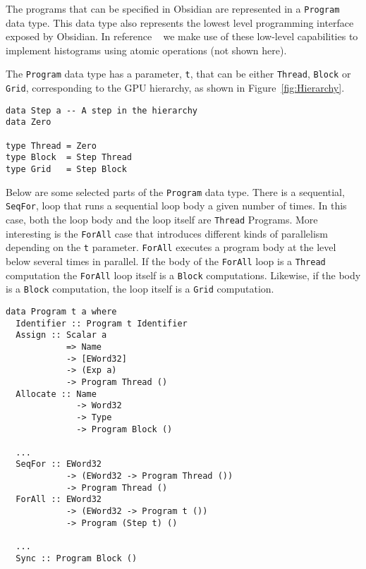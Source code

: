 The programs that can be specified in Obsidian
are represented in a {\tt Program} data type.
This data type also represents the lowest level programming interface 
exposed by Obsidian. In reference ~\cite{JOSEFJOELCSORT} we make use of these low-level 
capabilities to implement histograms using atomic operations (not shown here). 

The {\tt Program} data type has a parameter, {\tt t}, that can be 
either {\tt Thread}, {\tt Block} or {\tt Grid}, corresponding to the GPU hierarchy, as shown in Figure~\ref{fig:Hierarchy}.

\begin{small}
\begin{verbatim} 
data Step a -- A step in the hierarchy
data Zero
  
type Thread = Zero 
type Block  = Step Thread 
type Grid   = Step Block  
\end{verbatim} 
\end{small}


Below are some selected parts of the  {\tt Program} data type. There 
is a sequential, {\tt SeqFor}, loop that runs a sequential loop body a given 
number of times. In this case, both the loop body and the loop itself are 
{\tt Thread} Programs. More interesting is the {\tt ForAll} case that introduces 
 different kinds of parallelism depending on the {\tt t} parameter.
{\tt ForAll} executes a program body at the level below several times in parallel. 
If the body of the {\tt ForAll} loop is a {\tt Thread} computation the {\tt ForAll} loop 
itself is a {\tt Block} computations. Likewise, if the body is a {\tt Block} computation, 
the loop itself is a {\tt Grid} computation. 

\begin{small} 
\begin{Verbatim}[samepage=true]
data Program t a where 
  Identifier :: Program t Identifier 
  Assign :: Scalar a
            => Name 
            -> [EWord32]
            -> (Exp a)
            -> Program Thread ()
  Allocate :: Name 
              -> Word32 
              -> Type 
              -> Program Block ()

  ... 
  SeqFor :: EWord32 
            -> (EWord32 -> Program Thread ())
            -> Program Thread ()
  ForAll :: EWord32 
            -> (EWord32 -> Program t ())
            -> Program (Step t) ()
 
  ... 
  Sync :: Program Block () 
   
\end{Verbatim}
\end{small} 

